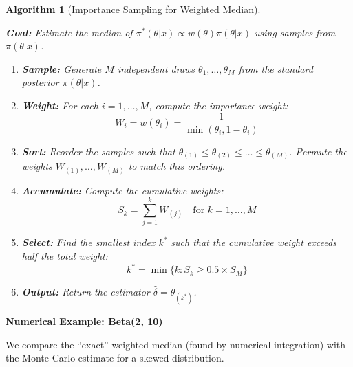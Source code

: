 \documentclass[
  letterpaper,
  DIV=11,
  numbers=noendperiod]{scrreprt}
\renewcommand{\[}{\begin{equation}}
\renewcommand{\]}{\end{equation}}
\theoremstyle{definition}
\theoremstyle{plain}
\newtheorem{algorithm}{Algorithm}[chapter]
\theoremstyle{plain}
\theoremstyle{plain}
\theoremstyle{definition}
\theoremstyle{plain}
\theoremstyle{remark}
\begin{document}
\begin{algorithm}[Importance Sampling for Weighted
Median]\protect\hypertarget{alg-weighted-median}{}\label{alg-weighted-median}

\textbf{Goal:} Estimate the median of
\(\pi^*(\theta|x) \propto w(\theta)\pi(\theta|x)\) using samples from
\(\pi(\theta|x)\).

\begin{enumerate}
\def\labelenumi{\arabic{enumi}.}
\item
  \textbf{Sample:} Generate \(M\) independent draws
  \(\theta_1, \dots, \theta_M\) from the standard posterior
  \(\pi(\theta|x)\).
\item
  \textbf{Weight:} For each \(i = 1, \dots, M\), compute the importance
  weight: \[ W_i = w(\theta_i) = \frac{1}{\min(\theta_i, 1-\theta_i)} \]
\item
  \textbf{Sort:} Reorder the samples such that
  \(\theta_{(1)} \le \theta_{(2)} \le \dots \le \theta_{(M)}\). Permute
  the weights \(W_{(1)}, \dots, W_{(M)}\) to match this ordering.
\item
  \textbf{Accumulate:} Compute the cumulative weights:
  \[ S_k = \sum_{j=1}^k W_{(j)} \quad \text{for } k=1, \dots, M \]
\item
  \textbf{Select:} Find the smallest index \(k^*\) such that the
  cumulative weight exceeds half the total weight:
  \[ k^* = \min \{ k : S_k \ge 0.5 \times S_M \} \]
\item
  \textbf{Output:} Return the estimator
  \(\hat{\delta} = \theta_{(k^*)}\).
\end{enumerate}

\end{algorithm}

\textbf{Numerical Example: Beta(2, 10)}

We compare the ``exact'' weighted median (found by numerical
integration) with the Monte Carlo estimate for a skewed distribution.
\end{document}
